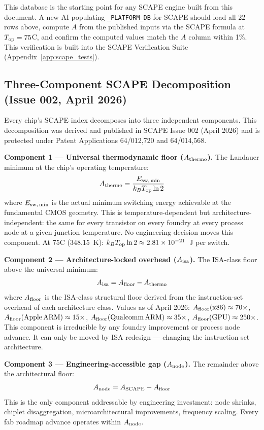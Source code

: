 \documentclass[12pt,a4paper]{article}
\begin{document}
This database is the starting point for any SCAPE engine built from this
document. A new AI populating \texttt{\_PLATFORM\_DB} for SCAPE should
load all 22 rows above, compute $A$ from the published inputs via the SCAPE
formula at $T_{\rm op} = 75$\textdegree C, and confirm the computed values
match the $A$ column within 1\%. This verification is built into the
SCAPE Verification Suite (Appendix~\ref{app:scape_tests}).

\subsection{Three-Component SCAPE Decomposition (Issue 002, April 2026)}

Every chip's SCAPE index decomposes into three independent components.
This decomposition was derived and published in SCAPE Issue 002 (April 2026)
and is protected under Patent Applications 64/012,720 and 64/014,568.

\textbf{Component 1 --- Universal thermodynamic floor ($A_{\rm thermo}$).}
The Landauer minimum at the chip's operating temperature:
\begin{equation}
A_{\rm thermo} = \frac{E_{\rm sw,\,min}}{k_B T_{\rm op} \ln 2}
\end{equation}
where $E_{\rm sw,\,min}$ is the actual minimum switching energy achievable
at the fundamental CMOS geometry. This is temperature-dependent but
architecture-independent: the same for every transistor on every foundry
at every process node at a given junction temperature. No engineering
decision moves this component. At 75\textdegree C (348.15~K):
$k_B T_{\rm op} \ln 2 \approx 2.81 \times 10^{-21}$~J per switch.

\textbf{Component 2 --- Architecture-locked overhead ($A_{\rm isa}$).}
The ISA-class floor above the universal minimum:
\begin{equation}
A_{\rm isa} = A_{\rm floor} - A_{\rm thermo}
\end{equation}
where $A_{\rm floor}$ is the ISA-class structural floor derived from the
instruction-set overhead of each architecture class.
Values as of April 2026: $A_{\rm floor}({\rm x86}) \approx 70\times$,
$A_{\rm floor}({\rm Apple\,ARM}) \approx 15\times$,
$A_{\rm floor}({\rm Qualcomm\,ARM}) \approx 35\times$,
$A_{\rm floor}({\rm GPU}) \approx 250\times$.
This component is irreducible by any foundry improvement or process node advance.
It can only be moved by ISA redesign --- changing the instruction set architecture.

\textbf{Component 3 --- Engineering-accessible gap ($A_{\rm node}$).}
The remainder above the architectural floor:
\begin{equation}
A_{\rm node} = A_{\rm SCAPE} - A_{\rm floor}
\end{equation}
This is the only component addressable by engineering investment: node shrinks,
chiplet disaggregation, microarchitectural improvements, frequency scaling.
Every fab roadmap advance operates within $A_{\rm node}$.
\end{document}
